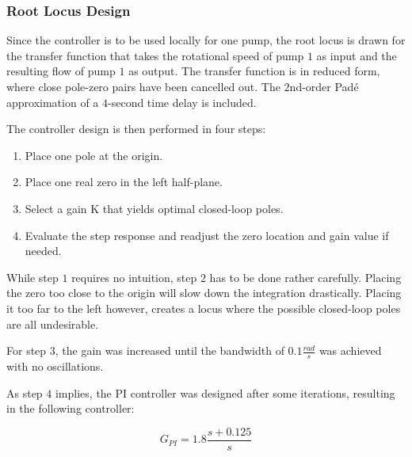 \subsubsection{Root Locus Design}
Since the controller is to be used locally for one pump, the root locus is drawn for the transfer function that takes the rotational speed of pump $1$ as input and the resulting flow of pump $1$ as output. The transfer function is in reduced form, where close pole-zero pairs have been cancelled out. The $2$nd-order Padé approximation of a $4$-second time delay is included.


The controller design is then performed in four steps:
\begin{enumerate}
	\item Place one pole at the origin.
	\item Place one real zero in the left half-plane.
	\item Select a gain K that yields optimal closed-loop poles.
	\item Evaluate the step response and readjust the zero location and gain value if needed.
\end{enumerate}

While step $1$ requires no intuition, step $2$ has to be done rather carefully. Placing the zero too close to the origin will slow down the integration drastically. Placing it too far to the left however, creates a locus where the possible closed-loop poles are all undesirable.

For step $3$, the gain was increased until the bandwidth of $0.1 \si{\frac{rad}{s}}$ was achieved with no oscillations. 

As step $4$ implies, the PI controller was designed after some iterations, resulting in the following controller:

 \begin{equation}\label{eq:PITransferFunction}
	G_{PI} = 1.8 \frac{s+0.125}{s}
\end{equation}

